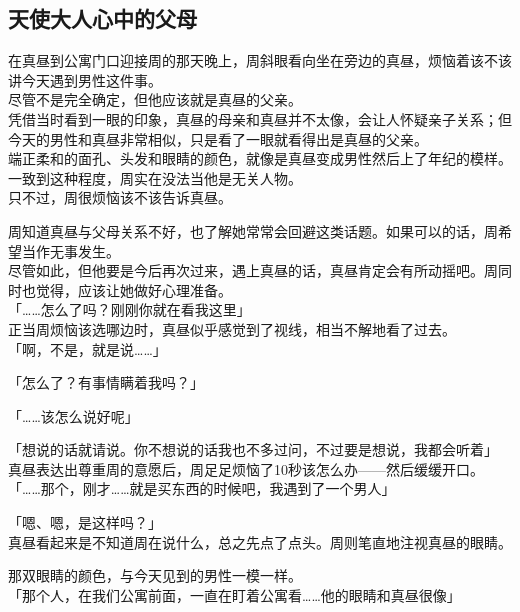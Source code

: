 \subsection{天使大人心中的父母}

在真昼到公寓门口迎接周的那天晚上，周斜眼看向坐在旁边的真昼，烦恼着该不该讲今天遇到男性这件事。\\

尽管不是完全确定，但他应该就是真昼的父亲。\\

凭借当时看到一眼的印象，真昼的母亲和真昼并不太像，会让人怀疑亲子关系；但今天的男性和真昼非常相似，只是看了一眼就看得出是真昼的父亲。\\

端正柔和的面孔、头发和眼睛的颜色，就像是真昼变成男性然后上了年纪的模样。一致到这种程度，周实在没法当他是无关人物。\\

只不过，周很烦恼该不该告诉真昼。

周知道真昼与父母关系不好，也了解她常常会回避这类话题。如果可以的话，周希望当作无事发生。\\

尽管如此，但他要是今后再次过来，遇上真昼的话，真昼肯定会有所动摇吧。周同时也觉得，应该让她做好心理准备。\\

「……怎么了吗？刚刚你就在看我这里」\\

正当周烦恼该选哪边时，真昼似乎感觉到了视线，相当不解地看了过去。\\

「啊，不是，就是说……」

「怎么了？有事情瞒着我吗？」

「……该怎么说好呢」

「想说的话就请说。你不想说的话我也不多过问，不过要是想说，我都会听着」\\

真昼表达出尊重周的意愿后，周足足烦恼了10秒该怎么办——然后缓缓开口。\\

「……那个，刚才……就是买东西的时候吧，我遇到了一个男人」

「嗯、嗯，是这样吗？」\\

真昼看起来是不知道周在说什么，总之先点了点头。周则笔直地注视真昼的眼睛。

那双眼睛的颜色，与今天见到的男性一模一样。\\

「那个人，在我们公寓前面，一直在盯着公寓看……他的眼睛和真昼很像」

